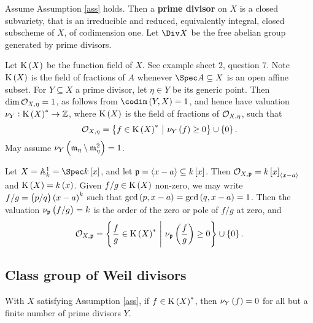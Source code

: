 \begin{definition*}
Assume Assumption \ref{ass} holds. Then a \textbf{prime divisor} on $ X $ is a closed subvariety, that is an irreducible and reduced, equivalently integral, closed subscheme of $ X $, of codimension one. Let $ \Div X $ be the free abelian group generated by prime divisors.
\end{definition*}

\pagebreak

Let $ \K\br{X} $ be the function field of $ X $. See example sheet $ 2 $, question $ 7 $. Note $ \K\br{X} $ is the field of fractions of $ A $ whenever $ \Spec A \subseteq X $ is an open affine subset. For $ Y \subseteq X $ a prime divisor, let $ \eta \in Y $ be its generic point. Then $ \dim \mathcal{O}_{X, \eta} = 1 $, as follows from $ \codim\br{Y, X} = 1 $, and hence have valuation $ \nu_Y : \K\br{X}^* \to \ZZ $, where $ \K\br{X} $ is the field of fractions of $ \mathcal{O}_{X, \eta} $, such that
$$ \OOO_{X, \eta} = \cbr{f \in \K\br{X}^* \st \nu_Y\br{f} \ge 0} \cup \cbr{0}. $$
May assume $ \nu_Y\br{\mmm_\eta \setminus \mmm_\eta^2} = 1 $.

\begin{example*}
Let $ X = \AA_k^1 = \Spec k\sbr{x} $, and let $ \ppp = \abr{x - a} \subseteq k\sbr{x} $. Then $ \OOO_{X, \ppp} = k\sbr{x}_{\abr{x - a}} $ and $ \K\br{X} = k\br{x} $. Given $ f / g \in \K\br{X} $ non-zero, we may write $ f / g = \br{p / q}\br{x - a}^k $ such that $ \gcd\br{p, x - a} = \gcd\br{q, x - a} = 1 $. Then the valuation $ \nu_\ppp\br{f / g} = k $ is the order of the zero or pole of $ f / g $ at zero, and
$$ \OOO_{X, \ppp} = \cbr{\dfrac{f}{g} \in \K\br{X}^* \st \nu_\ppp\br{\dfrac{f}{g}} \ge 0} \cup \cbr{0}. $$
\end{example*}

\subsection{Class group of Weil divisors}

\begin{lemma}
\label{lem:primedivisor}
With $ X $ satisfying Assumption \ref{ass}, if $ f \in \K\br{X}^* $, then $ \nu_Y\br{f} = 0 $ for all but a finite number of prime divisors $ Y $.
\end{lemma}

